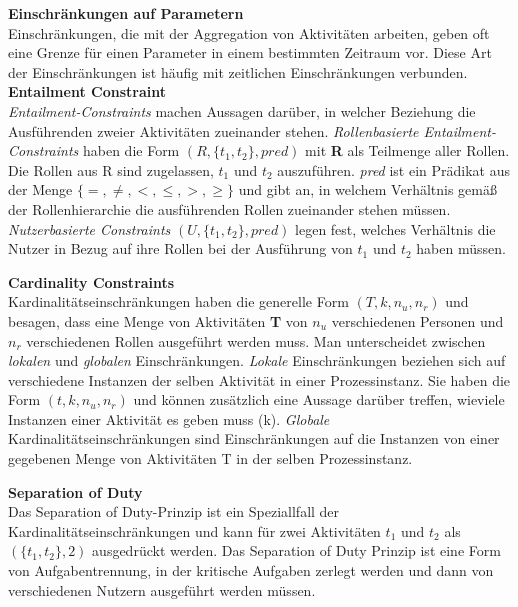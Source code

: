 \textbf{Einschränkungen auf Parametern}\\
Einschränkungen, die mit der Aggregation von Aktivitäten arbeiten, geben oft eine Grenze für einen Parameter in einem bestimmten Zeitraum vor. Diese Art der Einschränkungen ist häufig mit zeitlichen Einschränkungen verbunden.\\

\textbf{Entailment Constraint}\\
\textit{Entailment-Constraints} machen Aussagen darüber, in welcher Beziehung die Ausführenden zweier Aktivitäten zueinander stehen.
\textit{Rollenbasierte Entailment-Constraints} haben die Form $(R, \{t_1,t_2\}, pred)$ mit \textbf{R} als Teilmenge aller Rollen. Die Rollen aus R sind zugelassen, $t_1$ und $t_2$ auszuführen. \textit{pred} ist ein Prädikat aus der Menge $\{=, \neq,<, \leq,>, \geq \}$ und gibt an, in welchem Verhältnis gemäß der Rollenhierarchie die ausführenden Rollen zueinander stehen müssen.\\
\textit{Nutzerbasierte Constraints} $(U, \{t_1,t_2\}, pred)$ legen fest, welches Verhältnis die Nutzer in Bezug auf ihre Rollen bei der Ausführung von $t_1$ und $t_2$ haben müssen.
\cite{wolter_modeling_of_TBAC_in_BPMN} \cite{Entailment1} \cite{tan_consistency}

\textbf{Cardinality Constraints}\\
Kardinalitätseinschränkungen haben die generelle Form $(T, k, n_u, n_r)$ und besagen, dass eine Menge von Aktivitäten \textbf{T} von $n_u$ verschiedenen Personen und $n_r$ verschiedenen Rollen ausgeführt werden muss. Man unterscheidet zwischen \textit{lokalen} und \textit{globalen} Einschränkungen. \textit{Lokale} Einschränkungen beziehen sich auf verschiedene Instanzen der selben Aktivität in einer Prozessinstanz. Sie haben die Form $(t, k, n_u, n_r)$ und können zusätzlich eine Aussage darüber treffen, wieviele Instanzen einer Aktivität es geben muss (k). \textit{Globale} Kardinalitätseinschränkungen sind Einschränkungen auf die Instanzen von einer gegebenen Menge von Aktivitäten T in der selben Prozessinstanz.
\cite{wolter_modeling_of_TBAC_in_BPMN} \cite{Entailment1} \cite{tan_consistency}


\textbf{Separation of Duty}\\
Das Separation of Duty-Prinzip ist ein Speziallfall der Kardinalitätseinschränkungen und kann für zwei Aktivitäten $t_1$ und $t_2$ als $(\{t_1,t_2\},2)$ ausgedrückt werden. Das Separation of Duty Prinzip ist eine Form von Aufgabentrennung, in der kritische Aufgaben zerlegt werden und dann von verschiedenen Nutzern ausgeführt werden müssen.
\cite{SOD}\cite{SOD2}


